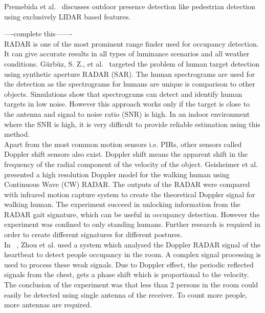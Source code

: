 Premebida et al.~\cite{teixeira2010survey} discusses outdoor presence detection like pedestrian detection using exclusively LIDAR based features.


----complete this-------
\\

RADAR is one of the most prominent range finder used for occupancy detection. It can give accurate results in all types of luminance scenarios and all weather conditions.
G\"{u}rb\"{u}z, S. Z., et al.~\cite{gurbuz2007detection} targeted the problem of human target detection using synthetic aperture RADAR (SAR). The human spectrograms are used for the detection as the spectrograms for humans are unique is comparison to other objects. Simulations show that spectrograms can detect and identify human targets in low noise. However this approach works only if the target is close to the antenna and signal to noise ratio (SNR) is high. In an indoor environment where the SNR is high, it is very difficult to provide reliable estimation using this method.
\\

Apart from the most common motion sensors i.e. PIRs, other sensors called Doppler shift sensors also exist. Doppler shift means the apparent shift in the frequency of the radial component of the velocity of the object.
Geisheimer et al.~\cite{geisheimer2002high} presented a high resolution Doppler model for the walking human using Continuous Wave (CW) RADAR. The outputs of the RADAR were compared with infrared motion capture system to create the theoretical Doppler signal for walking human. The experiment succeed in unlocking information from the RADAR gait signature, which can be useful in occupancy detection. However the experiment was confined to only standing humans. Further research is required in order to create different signatures for different postures. 
\\

In ~\cite{zhou2006detection}, Zhou et al. used a system which analysed the Doppler RADAR signal of the heartbeat to detect people occupancy in the room. A complex signal processing is used to process these weak signals. Due to Doppler effect, the periodic reflected signals from the chest, gets a phase shift which is proportional to the velocity. The conclusion of the experiment was that less than 2 persons in the room could easily be detected using single antenna of the receiver. To count more people, more antennas are required. 
\\

